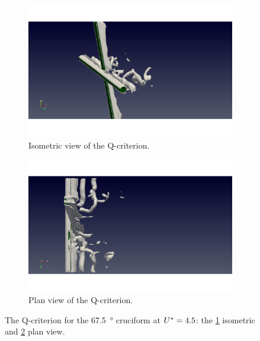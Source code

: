 \documentclass[oneside]{utmthesis}
\begin{document}
\begin{figure}
  \centering
  \begin{subfigure}[h]{0.9\textwidth}
    \includegraphics[width=\textwidth]{figs/qIso675U02}
    \caption{Isometric view of the Q-criterion.}
    \label{fig:qIso675U02}
  \end{subfigure}

  \begin{subfigure}[h]{0.9\textwidth}
    \includegraphics[width=\textwidth]{figs/qTop675U02}
    \caption{Plan view of the Q-criterion.}
    \label{fig:qTop675U02}
  \end{subfigure}

  \caption{The Q-criterion for the \SI{67.5}{\degree} cruciform at $U^{*} = 4.5$: the \ref{fig:qIso675U02} isometric and \ref{fig:qTop675U02} plan view.} \label{fig:qCrit675U02}
\end{figure}
\end{document}
